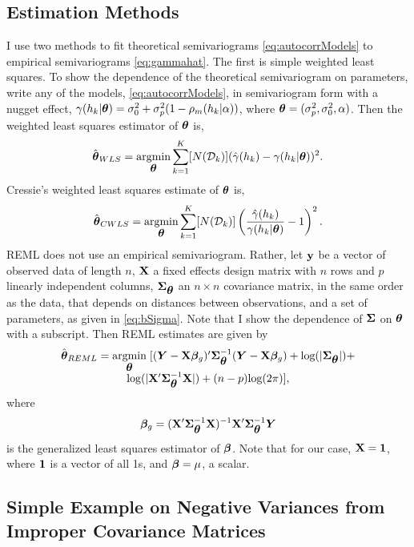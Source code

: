 \documentclass[11pt, titlepage]{article}\usepackage[]{graphicx}\usepackage[]{color}
\begin{document}
\begin{spacing}{1.9}
\subsection*{Estimation Methods}
I use two methods to fit theoretical semivariograms \ref{eq:autocorrModels} to empirical semivariograms \ref{eq:gammahat}.  The first is simple weighted least squares.  To show the dependence of the theoretical semivariogram on parameters, write any of the models, \ref{eq:autocorrModels}, in semivariogram form with a nugget effect, $\gamma(h_k|\mbox{\boldmath $\theta$}) = \sigma^2_0 + \sigma^2_p(1 - \rho_m(h_k|\alpha))$, where $\mbox{\boldmath $\theta$} = (\sigma^2_p, \sigma^2_0, \alpha)$.  Then the weighted least squares estimator of $\mbox{\boldmath $\theta$}$ is,
\[
\hat{\mbox{\boldmath $\theta$}}_{WLS} = \operatorname*{argmin}_{\mbox{\boldmath $\theta$}} \sum_{k=1}^K [N(\mathcal{D}_k)](\hat{\gamma}(h_k) - \gamma(h_k|\mbox{\boldmath $\theta$}))^2.
\]
Cressie's weighted least squares estimate of $\mbox{\boldmath $\theta$}$ is,
\[
\hat{\mbox{\boldmath $\theta$}}_{CWLS} = \operatorname*{argmin}_{\mbox{\boldmath $\theta$}} \sum_{k=1}^K [N(\mathcal{D}_k)]\left(\frac{\hat{\gamma}(h_k)}{\gamma(h_k|\mbox{\boldmath $\theta$})} - 1\right)^2.
\]
REML does not use an empirical semivariogram.  Rather, let $\mathbf{y}$ be a vector of observed data of length $n$, $\mathbf{X}$ a fixed effects design matrix with $n$ rows and $p$ linearly independent columns, $\mbox{\boldmath $\Sigma$}_{\mbox{\boldmath $\theta$}}$ an $n \times n$ covariance matrix, in the same order as the data, that depends on distances between observations, and a set of parameters, as given in \ref{eq:bSigma}.  Note that I show the dependence of $\mbox{\boldmath $\Sigma$}$ on $\mbox{\boldmath $\theta$}$ with a subscript. Then REML estimates are given by
\begin{equation} \label{eq:REML}
	\begin{array}{c}
					\hat{\mbox{\boldmath $\theta$}}_{REML}  = \underset{\mbox{\boldmath $\theta$}}{\mathrm{argmin}} \hspace{.1cm} [(\bm Y - \mathbf{X}{\boldsymbol{\beta}}_g)^{\prime}\mbox{\boldmath $\Sigma$}_{\mbox{\boldmath $\theta$}}^{-1}(\bm Y - \mathbf{X}{\boldsymbol{\beta}}_g) + \textrm{log}(|\mbox{\boldmath $\Sigma$}_{\mbox{\boldmath $\theta$}}|) + \\
					\textrm{log}(|\mathbf{X}^{\prime}\mbox{\boldmath $\Sigma$}_{\mbox{\boldmath $\theta$}}^{-1}\mathbf{X}|) + (n-p)\textrm{log}(2\pi)],
	\end{array}
\end{equation}
where 
\begin{equation}\label{eq:betaHat}
				{\boldsymbol{\beta}}_g = (\mathbf{X}^{\prime}\mbox{\boldmath $\Sigma$}_{\mbox{\boldmath $\theta$}}^{-1}\mathbf{X})^{-1}\mathbf{X}^{\prime}\mbox{\boldmath $\Sigma$}_{\mbox{\boldmath $\theta$}}^{-1}\bm Y
\end{equation}
is the generalized least squares estimator of ${\boldsymbol{\beta}}$. Note that for our case, $\mathbf{X} = \mathbf{1}$, where $\mathbf{1}$ is a vector of all 1s, and ${\boldsymbol{\beta}} = \mu$, a scalar.

\subsection*{Simple Example on Negative Variances from Improper Covariance Matrices}


\end{spacing}
\end{document}
